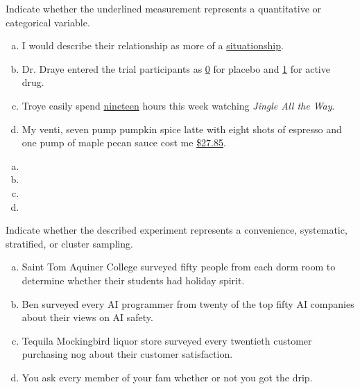 \documentclass[12pt,letterpaper]{exam}
\begin{document}
\examtitle
{} 
\scores
\bottomline
\newpage

\begin{questions}

\newpage
\question[10] Indicate whether the underlined measurement represents a quantitative or categorical variable.
	\begin{enumerate}[(a)]
	\item I would describe their relationship as more of a \underline{situationship}. 
	\item Dr. Draye entered the trial participants as \underline{0} for placebo and \underline{1} for active drug. 
	\item Troye easily spend \underline{nineteen} hours this week watching \textit{Jingle All the Way}. 
	\item My venti, seven pump pumpkin spice latte with eight shots of espresso and one pump of maple pecan sauce cost me \underline{\$27.85}. 
	\end{enumerate} \pspace

\sol 
\begin{enumerate}[(a)]
\item 
\item 
\item 
\item 
\end{enumerate}



\newpage
\question[10] Indicate whether the described experiment represents a convenience, systematic, stratified, or cluster sampling. 
	\begin{enumerate}[(a)]
	\item Saint Tom Aquiner College surveyed fifty people from each dorm room to determine whether their students had holiday spirit. 
	\item Ben surveyed every AI programmer from twenty of the top fifty AI companies about their views on AI safety. 
	\item Tequila Mockingbird liquor store surveyed every twentieth customer purchasing nog about their customer satisfaction.  
	\item You ask every member of your fam whether or not you got the drip. 
	\end{enumerate} \pspace


\end{questions}
\end{document}
